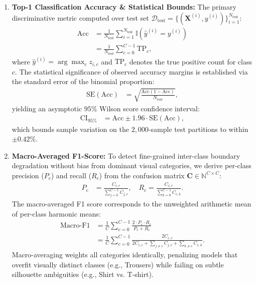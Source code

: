 \documentclass[pdflatex,sn-mathphys-num]{sn-jnl}%
\theoremstyle{thmstyleone}%
\theoremstyle{thmstyletwo}%
\theoremstyle{thmstylethree}%
\begin{document}
\begin{enumerate}
    \item \textbf{Top-1 Classification Accuracy \& Statistical Bounds:} The primary discriminative metric computed over test set $\mathcal{D}_{\mathrm{test}} = \{(\mathbf{X}^{(i)}, y^{(i)})\}_{i=1}^{N_{\mathrm{test}}}$:
    \begin{align}
    \mathrm{Acc} &= \frac{1}{N_{\mathrm{test}}} \sum_{i=1}^{N_{\mathrm{test}}} \mathbb{I}\left( \hat{y}^{(i)} = y^{(i)} \right) \nonumber \\
    &= \frac{1}{N_{\mathrm{test}}} \sum_{c=0}^{C-1} \mathrm{TP}_c,
    \label{eq:accuracy_metric}
    \end{align}
    where $\hat{y}^{(i)} = \arg\max_c z_{i,c}$ and $\mathrm{TP}_c$ denotes the true positive count for class $c$. The statistical significance of observed accuracy margins is established via the standard error of the binomial proportion:
    \begin{align}
    \mathrm{SE}(\mathrm{Acc}) &= \sqrt{\frac{\mathrm{Acc}(1 - \mathrm{Acc})}{N_{\mathrm{test}}}},
    \label{eq:accuracy_se}
    \end{align}
    yielding an asymptotic $95\%$ Wilson score confidence interval:
    \begin{align}
    \mathrm{CI}_{95\%} &= \mathrm{Acc} \pm 1.96 \cdot \mathrm{SE}(\mathrm{Acc}),
    \label{eq:accuracy_ci}
    \end{align}
    which bounds sample variation on the $2{,}000$-sample test partitions to within $\pm 0.42\%$.

    \item \textbf{Macro-Averaged F1-Score:} To detect fine-grained inter-class boundary degradation without bias from dominant visual categories, we derive per-class precision ($P_c$) and recall ($R_c$) from the confusion matrix $\mathbf{C} \in \mathbb{N}^{C \times C}$:
    \begin{align}
    P_c &= \frac{C_{c,c}}{\sum_{j=0}^{C-1} C_{j,c}}, \quad R_c = \frac{C_{c,c}}{\sum_{k=0}^{C-1} C_{c,k}}.
    \label{eq:precision_recall_defs}
    \end{align}
    The macro-averaged F1 score corresponds to the unweighted arithmetic mean of per-class harmonic means:
    \begin{align}
    \mathrm{Macro\text{-}F1} &= \frac{1}{C} \sum_{c=0}^{C-1} \frac{2 \cdot P_c \cdot R_c}{P_c + R_c} \nonumber \\
    &= \frac{1}{C} \sum_{c=0}^{C-1} \frac{2 C_{c,c}}{2 C_{c,c} + \sum_{j \ne c} C_{j,c} + \sum_{k \ne c} C_{c,k}}.
    \label{eq:macro_f1}
    \end{align}
    Macro-averaging weights all categories identically, penalizing models that overfit visually distinct classes (e.g., Trousers) while failing on subtle silhouette ambiguities (e.g., Shirt vs. T-shirt).


\end{enumerate}
\end{document}
